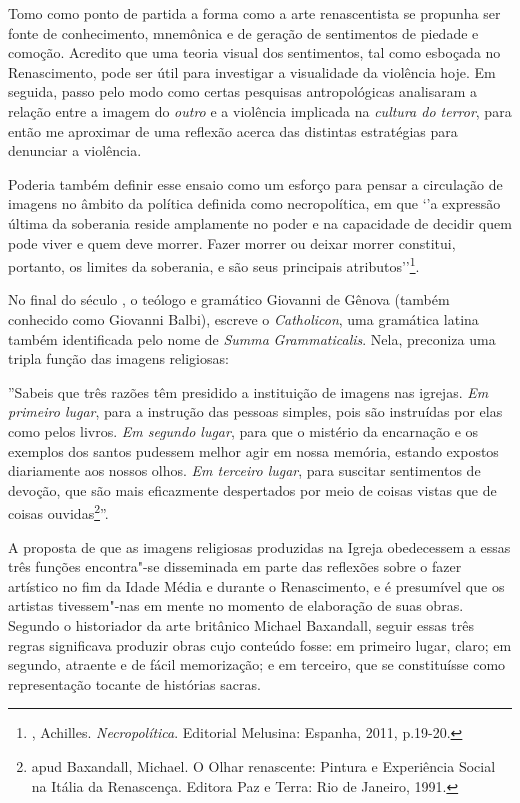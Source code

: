Tomo como ponto de partida a forma como a arte renascentista se propunha
ser fonte de conhecimento, mnemônica e de geração de sentimentos de
piedade e comoção. Acredito que uma teoria visual dos sentimentos, tal
como esboçada no Renascimento, pode ser útil para investigar a
visualidade da violência hoje. Em seguida, passo pelo modo como certas
pesquisas antropológicas analisaram a relação entre a imagem do
\emph{outro} e a violência implicada na \emph{cultura do terror}, para
então me aproximar de uma reflexão acerca das distintas estratégias para
denunciar a violência.

Poderia também definir esse ensaio como um esforço para pensar a
circulação de imagens no âmbito da política definida como necropolítica,
em que `'a expressão última da soberania reside amplamente no poder e na
capacidade de decidir quem pode viver e quem deve morrer. Fazer morrer
ou deixar morrer constitui, portanto, os limites da soberania, e são
seus principais atributos''\footnote{, Achilles.
  \emph{Necropolítica}. Editorial Melusina: Espanha, 2011, p.19-20.}.

\asterisc

No final do século , o teólogo e gramático Giovanni de Gênova
(também conhecido como Giovanni Balbi), escreve o \emph{Catholicon}, uma
gramática latina também identificada pelo nome de \emph{Summa}
\emph{Grammaticalis}. Nela, preconiza uma tripla função das imagens
religiosas:

''Sabeis que três razões têm presidido a instituição de imagens nas
igrejas. \emph{Em primeiro lugar}, para a instrução das pessoas simples,
pois são instruídas por elas como pelos livros. \emph{Em segundo lugar},
para que o mistério da encarnação e os exemplos dos santos pudessem
melhor agir em nossa memória, estando expostos diariamente aos nossos
olhos. \emph{Em terceiro lugar}, para suscitar sentimentos de devoção,
que são mais eficazmente despertados por meio de coisas vistas que de
coisas ouvidas\footnote{ apud Baxandall, Michael. O Olhar
  renascente: Pintura e Experiência Social na Itália da Renascença.
  Editora Paz e Terra: Rio de Janeiro, 1991.}''.

A proposta de que as imagens religiosas produzidas na Igreja obedecessem
a essas três funções encontra"-se disseminada em parte das reflexões
sobre o fazer artístico no fim da Idade Média e durante o Renascimento,
e é presumível que os artistas tivessem"-nas em mente no momento de
elaboração de suas obras. Segundo o historiador da arte britânico
Michael Baxandall, seguir essas três regras significava produzir obras
cujo conteúdo fosse: em primeiro lugar, claro; em segundo, atraente e de
fácil memorização; e em terceiro, que se constituísse como representação
tocante de histórias sacras.

